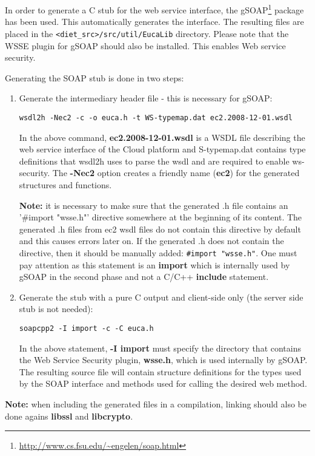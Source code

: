 In order to generate a C stub for the web service interface, the gSOAP\footnote{\url{http://www.cs.fsu.edu/~engelen/soap.html}}
package has been used. This automatically generates the interface. The resulting files
are placed in the \verb!<diet_src>/src/util/EucaLib! directory. Please note that the WSSE
plugin for gSOAP should also be installed. This enables Web service security.

Generating the SOAP stub is done in two steps:
\begin{enumerate}
\item{Generate the intermediary header file} - this is necessary for gSOAP:

\verb!wsdl2h -Nec2 -c -o euca.h -t WS-typemap.dat ec2.2008-12-01.wsdl!

In the above command, \textbf{ec2.2008-12-01.wsdl} is a WSDL file describing the web service
interface of the Cloud platform and S-typemap.dat contains type definitions that wsdl2h uses
to parse the wsdl and are required to enable ws-security. The \textbf{-Nec2} option creates
a friendly name (\textbf{ec2}) for the generated structures and functions.

\textbf{Note:} it is necessary to make sure that the generated .h file contains an '#import "wsse.h"'
directive somewhere at the beginning of its content. The generated .h files from ec2 wsdl files do not
contain this directive by default and this causes errors later on. If the generated .h does not contain
the directive, then it should be manually added: \verb!#import "wsse.h"!. One must pay attention as this
statement is an \textbf{import} which is internally used by gSOAP in the second phase and not a C/C++
\textbf{include} statement.
\item{Generate the stub} with a pure C output and client-side only (the server side stub is not needed):

\verb!soapcpp2 -I import -c -C euca.h!

In the above statement, \textbf{-I import} must specify the directory that contains the Web Service Security plugin, \textbf{wsse.h}, which
is used internally by gSOAP. The resulting source file will contain structure definitions for the types
used by the SOAP interface and methods used for calling the desired web method.
\end{enumerate}

\textbf{Note:} when including the generated files in a compilation, linking should also be done agains
\textbf{libssl} and \textbf{libcrypto}.

